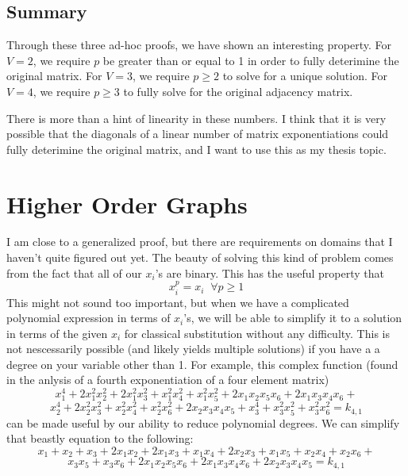 \documentclass[a4paper,12pt]{article}
\begin{document}
\subsection*{Summary}

Through these three ad-hoc proofs, we have shown an interesting property. For \(V=2\), we require \(p\) be greater than or equal to 1 in order to fully deterimine the original matrix. For \(V = 3\),
we require \(p \geq 2\) to solve for a unique solution.  For \(V = 4\), we require \(p \geq 3\) to fully solve for the original adjacency matrix.

There is more than a hint of linearity in these numbers.  I think that it is very possible that the diagonals of a linear number of matrix
exponentiations could fully deterimine the original matrix, and I want to use this as my thesis topic.

\section*{Higher Order Graphs}

I am close to a generalized proof, but there are requirements on domains that I haven't quite figured out yet.
The beauty of solving this kind of problem comes from the fact that all of our \(x_i\)'s are binary.  This has the useful property that
\[x_i^p = x_i \;\;\forall p \geq 1\]
This might not sound too important, but when we have a complicated polynomial expression in terms of \(x_i\)'s, 
we will be able to simplify it to a solution in terms of the given \(x_i\) for classical substitution without any difficulty. 
This is not nescessarily possible (and likely yields multiple solutions) if you have a a degree on your variable other than 1.
For example, this complex function (found in the anlysis of a fourth exponentiation of a four element matrix)
\[x_{1}^4 + 2x_{1}^2x_{2}^2 + 2x_{1}^2x_{3}^2 + x_{1}^2x_{4}^2 + x_{1}^2x_{5}^2 + 2x_{1}x_{2}x_{5}x_{6} + 2x_{1}x_{3}x_{4}x_{6} + \] 
\[x_{2}^4 + 2x_{2}^2x_{3}^2 + x_{2}^2x_{4}^2 + x_{2}^2x_{6}^2 + 2x_{2}x_{3}x_{4}x_{5} + x_{3}^4 + x_{3}^2x_{5}^2 + x_{3}^2x_{6}^2 = {k}_{4, 1}\]
can be made useful by our ability to reduce polynomial degrees.  We can simplify that beastly equation to the following:
\[x_{1} + x_{2} + x_{3} + 2x_{1}x_{2} + 2x_{1}x_{3} + x_{1}x_{4} + 2x_{2}x_{3} + x_{1}x_{5} + x_{2}x_{4} + x_{2}x_{6} + \]
\[x_{3}x_{5} + x_{3}x_{6} + 2x_{1}x_{2}x_{5}x_{6} + 2x_{1}x_{3}x_{4}x_{6} + 2x_{2}x_{3}x_{4}x_{5} = {k}_{4, 1}\]
\end{document}
